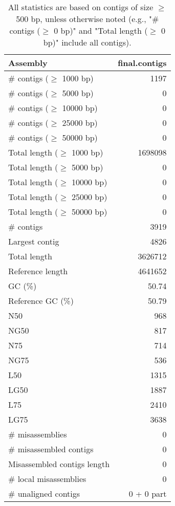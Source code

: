 \documentclass[12pt,a4paper]{article}
\begin{document}
\begin{table}[ht]
\begin{center}
\caption{All statistics are based on contigs of size $\geq$ 500 bp, unless otherwise noted (e.g., "\# contigs ($\geq$ 0 bp)" and "Total length ($\geq$ 0 bp)" include all contigs).}
\begin{tabular}{|l*{1}{|r}|}
\hline
Assembly & final.contigs \\ \hline
\# contigs ($\geq$ 1000 bp) & 1197 \\ \hline
\# contigs ($\geq$ 5000 bp) & 0 \\ \hline
\# contigs ($\geq$ 10000 bp) & 0 \\ \hline
\# contigs ($\geq$ 25000 bp) & 0 \\ \hline
\# contigs ($\geq$ 50000 bp) & 0 \\ \hline
Total length ($\geq$ 1000 bp) & 1698098 \\ \hline
Total length ($\geq$ 5000 bp) & 0 \\ \hline
Total length ($\geq$ 10000 bp) & 0 \\ \hline
Total length ($\geq$ 25000 bp) & 0 \\ \hline
Total length ($\geq$ 50000 bp) & 0 \\ \hline
\# contigs & 3919 \\ \hline
Largest contig & 4826 \\ \hline
Total length & 3626712 \\ \hline
Reference length & 4641652 \\ \hline
GC (\%) & 50.74 \\ \hline
Reference GC (\%) & 50.79 \\ \hline
N50 & 968 \\ \hline
NG50 & 817 \\ \hline
N75 & 714 \\ \hline
NG75 & 536 \\ \hline
L50 & 1315 \\ \hline
LG50 & 1887 \\ \hline
L75 & 2410 \\ \hline
LG75 & 3638 \\ \hline
\# misassemblies & 0 \\ \hline
\# misassembled contigs & 0 \\ \hline
Misassembled contigs length & 0 \\ \hline
\# local misassemblies & 0 \\ \hline
\# unaligned contigs & 0 + 0 part \\ \hline

\end{tabular}
\end{center}
\end{table}
\end{document}
